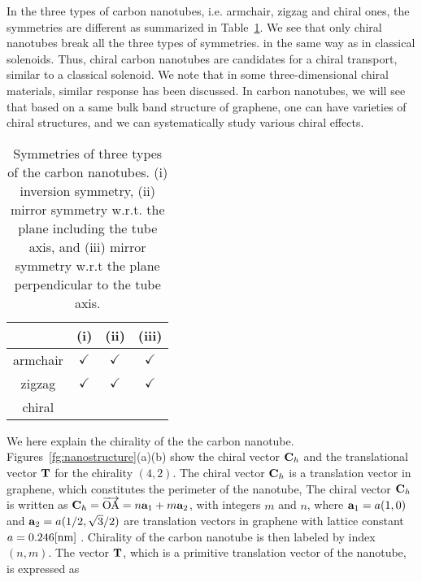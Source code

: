 \documentclass[journal=nalefd,manuscript=article,layout=twocolumn]{achemso}
\begin{document}
In the three types of carbon nanotubes, i.e. armchair, zigzag and chiral ones, the symmetries 
are different as summarized in Table\ \ref{tbl:sym}. We see that only chiral nanotubes break all the three types of symmetries. in the same way as in classical solenoids. 
Thus, chiral carbon nanotubes are candidates for a chiral transport, similar to a classical solenoid. 
We note that in some three-dimensional chiral materials, similar response has been discussed. In carbon nanotubes, we will see that based on a same bulk band structure of graphene,
one can have varieties of chiral structures, and we can systematically study various chiral effects.
\begin{table}
  \begin{tabular}{|c |c|c|c |}
    \hline
       &(i) & (ii) & (iii) \\
    \hline
    armchair&$\checkmark$&$\checkmark$&$\checkmark$\\
    zigzag&$\checkmark$&$\checkmark$&$\checkmark$\\
    chiral& & &\\
    \hline
    \end{tabular}
\caption{Symmetries of three types of the carbon nanotubes. (i) inversion symmetry,
(ii) mirror symmetry w.r.t. the plane including the tube axis, and (iii) mirror symmetry w.r.t the plane perpendicular to the tube axis. }
   \label{tbl:sym}
\end{table}
 
%

We here explain the chirality of the the carbon nanotube. 
Figures\ \ref{fg:nanostructure}(a)(b)  show the chiral vector ${\bf C}_h$ and the translational 
vector ${\bf T}$ for the chirality $(4,2)$. 
The chiral vector ${\bf C}_h$ is a translation vector in graphene, which constitutes 
the perimeter of the nanotube,  
The chiral vector ${\bf C}_h$ is written as ${\bf C}_h=\overrightarrow{\rm OA}=n{\bf a}_1+ m{\bf a}_2$, 
with integers $m$ and $n$, where ${\bf a}_1=a(1,0)$ and ${\bf a}_2=a(1/2,\sqrt{3}/2)$ are translation vectors in graphene with 
lattice constant $a=0.246 {\rm [nm]}$ \cite{Saito_1998,Dresselhaus_1996,Ajiki_1993}. 
Chirality of the carbon nanotube is then labeled by index $(n,m)$.
The vector ${\bf T}$, which is a primitive translation vector of the nanotube, 
is expressed as
\end{document}

